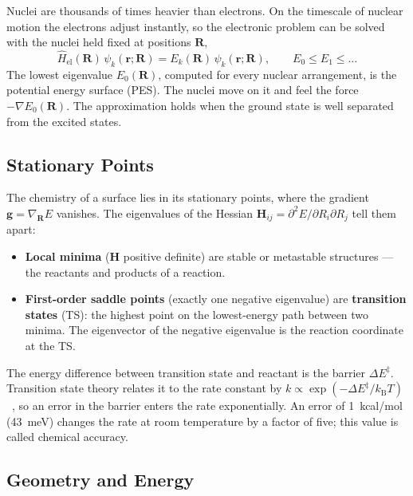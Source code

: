 Nuclei are thousands of times heavier than electrons. On the timescale of
nuclear motion the electrons adjust instantly, so the electronic problem can
be solved with the nuclei held fixed at positions $\mathbf{R}$,
\begin{equation}
  \hat{H}_\text{el}(\mathbf{R})\, \psi_k(\mathbf{r};\mathbf{R})
  = E_k(\mathbf{R})\, \psi_k(\mathbf{r};\mathbf{R}),
  \qquad E_0 \le E_1 \le \dots
  \label{eq:electronic-schrodinger}
\end{equation}
The lowest eigenvalue $E_0(\mathbf{R})$, computed for every nuclear
arrangement, is the potential energy surface (PES). The nuclei move on it and
feel the force $-\nabla E_0(\mathbf{R})$. The approximation holds when the
ground state is well separated from the excited states.

\subsection{Stationary Points}
\label{sec:background-stationary}

The chemistry of a surface lies in its stationary points, where the gradient
$\mathbf{g} = \nabla_\mathbf{R} E$ vanishes. The eigenvalues of the Hessian
$\mathbf{H}_{ij} = \partial^2 E / \partial R_i \partial R_j$ tell them apart:

\begin{itemize}
  \item \textbf{Local minima} ($\mathbf{H}$ positive definite) are stable or
    metastable structures --- the reactants and products of a reaction.
  \item \textbf{First-order saddle points} (exactly one negative eigenvalue)
    are \textbf{transition states} (TS): the highest point on the
    lowest-energy path between two minima. The eigenvector of the negative
    eigenvalue is the reaction coordinate at the TS.
\end{itemize}

The energy difference between transition state and reactant is the barrier
$\Delta E^\ddagger$. Transition state theory relates it to the rate constant
by $k \propto \exp(-\Delta E^\ddagger / k_\text{B} T)$~\cite{eyring1935}, so
an error in the barrier enters the rate exponentially. An error of
1~kcal/mol (43~meV) changes the rate at room temperature by a factor of
five; this value is called chemical accuracy.

\subsection{Geometry and Energy}
\label{sec:geom-energy}

